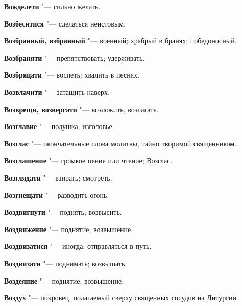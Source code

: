 \begin{mymulticols}{2}
\noindent\textbf{Вожделети} "--- сильно желать. 




\noindent\textbf{Возбеситися} "--- сделаться неистовым. 




\noindent\textbf{Возбранный, взбранный} "--- военный; храбрый в бранях; победоносный. 




\noindent\textbf{Возбраняти} "--- препятствовать; удерживать. 




\noindent\textbf{Возбряцати} "--- воспеть; хвалить в песнях. 




\noindent\textbf{Возвлачити} "--- затащить наверх. 




\noindent\textbf{Возврещи, возвергати} "--- возложить, возлагать. 




\noindent\textbf{Возглавие} "--- подушка; изголовье. 




\noindent\textbf{Возглас} "--- окончательные слова молитвы, тайно творимой священником. 




\noindent\textbf{Возглашение} "--- громкое пение или чтение; Возглас. 




\noindent\textbf{Возглядати} "--- взирать; смотреть. 




\noindent\textbf{Возгнещати} "--- разводить огонь. 




\noindent\textbf{Воздвигнути} "--- поднять; возвысить. 




\noindent\textbf{Воздвижение} "--- поднятие, возвышение. 




\noindent\textbf{Воздвизатися} "--- иногда: отправляться в путь. 




\noindent\textbf{Воздвизати} "--- поднимать; возвышать. 




\noindent\textbf{Воздеяние} "--- поднятие, возвышение. 




\noindent\textbf{Воздух} "--- покровец, полагаемый сверху священных сосудов на Литургии. 





\end{mymulticols}
